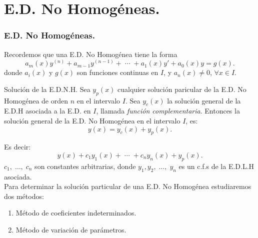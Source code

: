 \documentclass[9pt]{beamer}
\begin{document}
\frame{\titlepage}

\section{E.D. No Homogéneas.} %
\begin{frame}[t]
	\frametitle{E.D. No Homogéneas.}
	\begin{block}{}
		Recordemos que una E.D. No Homogénea tiene la forma
		\[
			a_m(x) y^{(n)}+a_{m-1} y^{(n-1)} + \;\cdots\; + a_1(x) y' + a_0(x) y = g(x) .
		\]
		donde \(a_i(x)\) y \(g(x)\) son funciones continuas en \(I\), y \(a_n(x) \ne 0\), \(\forall x \in I\).
	\end{block}
	\begin{block}{Solución de la E.D.N.H.}
		Sea \(y_p(x)\) cualquier solución paricular de la E.D. No Homogénea de orden \(n\) en el intervalo \(I\). Sea \(y_c(x)\) la solución general de la E.D.H asociada a la E.D. en \(I\), llamada \textit{función complementaria}. Entonces la solución general de la E.D. No Homogénea en el intervalo \(I\), es:
		\[
			y(x) = y_c(x) + y_p(x).
		\]
	\end{block}
\end{frame}

\begin{frame}[t]
	\begin{block}{}
		Es decir:
		\[
			y(x) +c_1y_1(x) + \;\cdots\; + c_ny_n(x) + y_p(x).
		\]
		\(c_1, \;\ldots,\; c_n\) son constantes arbitrarias, donde \(y_1,y_2, \;\ldots,\; y_n\) es un c.f.s de la E.D.L.H asociada. \\[2mm]
		Para determinar la solución particular de una E.D. No Homogénea estudiaremos dos métodos:
		\begin{enumerate}
			\item Método de coeficientes indeterminados.
			\item Método de variación de parámetros.
		\end{enumerate}
	\end{block}
\end{frame}
\end{document}
